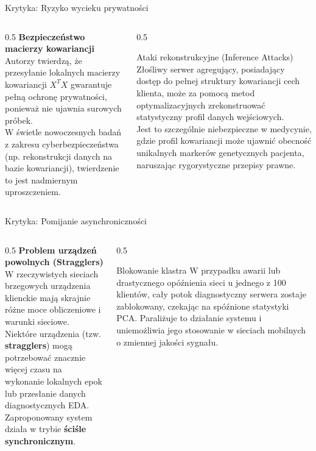 \documentclass[9pt,aspectratio=169]{beamer}
\begin{document}
\begin{frame}{Krytyka: Ryzyko wycieku prywatności}
\begin{columns}[T]
\begin{column}{0.5\textwidth}
\textbf{Bezpieczeństwo macierzy kowariancji}\\[4pt]
Autorzy twierdzą, że przesyłanie lokalnych macierzy kowariancji $X^TX$ gwarantuje pełną ochronę prywatności, ponieważ nie ujawnia surowych próbek.\\[6pt]
W świetle nowoczesnych badań z zakresu cyberbezpieczeństwa (np. rekonstrukcji danych na bazie kowariancji), twierdzenie to jest nadmiernym uproszczeniem.
\end{column}
\begin{column}{0.5\textwidth}
\begin{infoboxorange}{Ataki rekonstrukcyjne (Inference Attacks)}
Złośliwy serwer agregujący, posiadający dostęp do pełnej struktury kowariancji cech klienta, może za pomocą metod optymalizacyjnych zrekonstruować statystyczny profil danych wejściowych.\\[6pt]
Jest to szczególnie niebezpieczne w medycynie, gdzie profil kowariancji może ujawnić obecność unikalnych markerów genetycznych pacjenta, naruszając rygorystyczne przepisy prawne.
\end{infoboxorange}
\end{column}
\end{columns}
\end{frame}

\begin{frame}{Krytyka: Pomijanie asynchroniczności}
\begin{columns}[T]
\begin{column}{0.5\textwidth}
\textbf{Problem urządzeń powolnych (Stragglers)}\\[4pt]
W rzeczywistych sieciach brzegowych urządzenia klienckie mają skrajnie różne moce obliczeniowe i warunki sieciowe.\\[6pt]
Niektóre urządzenia (tzw. \textbf{stragglers}) mogą potrzebować znacznie więcej czasu na wykonanie lokalnych epok lub przesłanie danych diagnostycznych EDA.\\[6pt]
Zaproponowany system działa w trybie \textbf{ściśle synchronicznym}.
\end{column}
\begin{column}{0.5\textwidth}
\begin{infoboxorange}{Blokowanie klastra}
W przypadku awarii lub drastycznego opóźnienia sieci u jednego z 100 klientów, cały potok diagnostyczny serwera zostaje zablokowany, czekając na spóźnione statystyki PCA. Paraliżuje to działanie systemu i uniemożliwia jego stosowanie w sieciach mobilnych o zmiennej jakości sygnału.
\end{infoboxorange}
\end{column}
\end{columns}
\end{frame}
\end{document}
